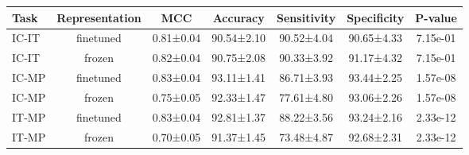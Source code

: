 \begin{tabular}{lcccccc}
\toprule
 Task & Representation &       MCC &   Accuracy & Sensitivity & Specificity &  P-value \\
\midrule
IC-IT &      finetuned & 0.81±0.04 & 90.54±2.10 &  90.52±4.04 &  90.65±4.33 & 7.15e-01 \\
IC-IT &         frozen & 0.82±0.04 & 90.75±2.08 &  90.33±3.92 &  91.17±4.32 & 7.15e-01 \\
IC-MP &      finetuned & 0.83±0.04 & 93.11±1.41 &  86.71±3.93 &  93.44±2.25 & 1.57e-08 \\
IC-MP &         frozen & 0.75±0.05 & 92.33±1.47 &  77.61±4.80 &  93.06±2.26 & 1.57e-08 \\
IT-MP &      finetuned & 0.83±0.04 & 92.81±1.37 &  88.22±3.56 &  93.24±2.16 & 2.33e-12 \\
IT-MP &         frozen & 0.70±0.05 & 91.37±1.45 &  73.48±4.87 &  92.68±2.31 & 2.33e-12 \\
\bottomrule
\end{tabular}

